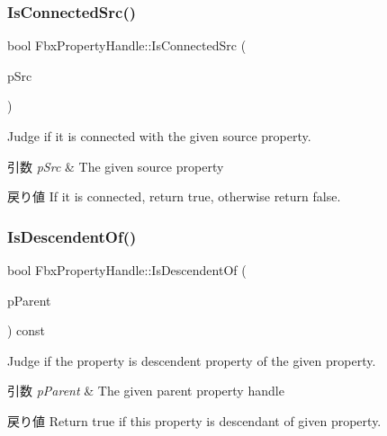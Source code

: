 \subsubsection{\texorpdfstring{Is\+Connected\+Src()}{IsConnectedSrc()}}
{\footnotesize\ttfamily bool Fbx\+Property\+Handle\+::\+Is\+Connected\+Src (\begin{DoxyParamCaption}\item[{const \hyperlink{class_fbx_property_handle}{Fbx\+Property\+Handle} \&}]{p\+Src }\end{DoxyParamCaption})}

Judge if it is connected with the given source property. 
\begin{DoxyParams}{引数}
{\em p\+Src} & The given source property \\
\hline
\end{DoxyParams}
\begin{DoxyReturn}{戻り値}
If it is connected, return true, otherwise return false. 
\end{DoxyReturn}
\mbox{\label{class_fbx_property_handle_af6d512f55181fbaf2f973aa33ebd1a34}} 
\subsubsection{\texorpdfstring{Is\+Descendent\+Of()}{IsDescendentOf()}}
{\footnotesize\ttfamily bool Fbx\+Property\+Handle\+::\+Is\+Descendent\+Of (\begin{DoxyParamCaption}\item[{const \hyperlink{class_fbx_property_handle}{Fbx\+Property\+Handle} \&}]{p\+Parent }\end{DoxyParamCaption}) const}

Judge if the property is descendent property of the given property. 
\begin{DoxyParams}{引数}
{\em p\+Parent} & The given parent property handle \\
\hline
\end{DoxyParams}
\begin{DoxyReturn}{戻り値}
Return true if this property is descendant of given property. 
\end{DoxyReturn}
\mbox{\label{class_fbx_property_handle_a832e6f2916497d538658f6eddc56dbc7}} 
